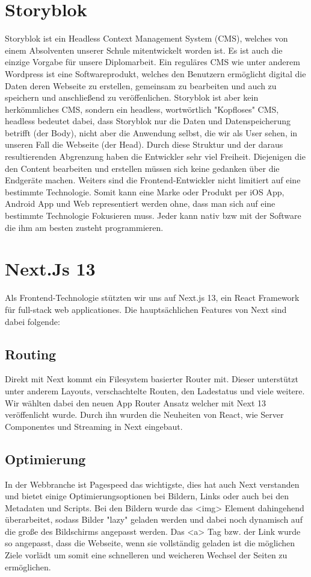 \section{Storyblok}

Storyblok ist ein Headless Context Management System (CMS), welches von einem Absolventen unserer Schule mitentwickelt worden ist.
Es ist auch die einzige Vorgabe für unsere Diplomarbeit. Ein reguläres CMS wie unter anderem Wordpress ist eine Softwareprodukt, 
welches den Benutzern ermöglicht digital die Daten deren Webseite zu erstellen, gemeinsam zu bearbeiten und auch zu speichern und anschließend zu veröffenlichen.
Storyblok ist aber kein herkömmliches CMS, sondern ein headless, wortwörtlich "Kopfloses" CMS, headless bedeutet dabei, dass Storyblok nur die Daten und Datenspeicherung betrifft (der Body), nicht aber die Anwendung selbst, die wir als User sehen, in unseren Fall die Webseite (der Head).
Durch diese Struktur und der daraus resultierenden Abgrenzung haben die Entwickler sehr viel Freiheit. Diejenigen die den Content bearbeiten und erstellen müssen sich keine gedanken über die Endgeräte machen.
Weiters sind die Frontend-Entwickler nicht limitiert auf eine bestimmte Technologie. Somit kann eine Marke oder Produkt per iOS App, Android App und Web representiert werden ohne, dass man sich auf eine bestimmte Technologie Fokusieren muss. Jeder kann nativ bzw mit der Software die ihm am besten zusteht programmieren.

\section{Next.Js 13}
Als Frontend-Technologie stützten wir uns auf Next.js 13, ein React Framework für full-stack web applicationes. 
Die hauptsächlichen Features von Next sind dabei folgende:

\subsection{Routing}
Direkt mit Next kommt ein Filesystem basierter Router mit. Dieser unterstützt unter anderem Layouts, verschachtelte Routen, den Ladestatus und viele weitere.
Wir wählten dabei den neuen App Router Ansatz welcher mit Next 13 veröffenlicht wurde. Durch ihn wurden die Neuheiten von React, wie Server Componentes und Streaming in Next eingebaut.

\subsection{Optimierung}
In der Webbranche ist Pagespeed das wichtigste, dies hat auch Next verstanden und bietet einige Optimierungsoptionen bei Bildern, Links oder auch bei den Metadaten und Scripts. 
Bei den Bildern wurde das <img> Element dahingehend überarbeitet, sodass Bilder "lazy" geladen werden und dabei noch dynamisch auf die große des Bildschirms angepasst werden. 
Das <a> Tag bzw. der Link wurde so angepasst, dass die Webseite, wenn sie vollständig geladen ist die möglichen Ziele vorlädt um somit eine schnelleren und weicheren Wechsel der Seiten zu ermöglichen.

